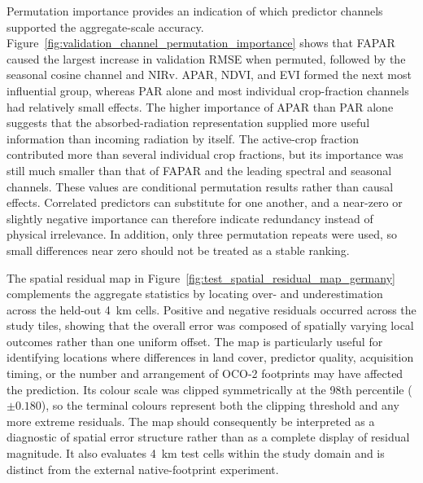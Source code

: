 Permutation importance provides an indication of which predictor channels supported the
aggregate-scale accuracy. Figure~\ref{fig:validation_channel_permutation_importance} shows
that FAPAR caused the largest increase in validation RMSE when permuted, followed by the
seasonal cosine channel and NIRv. APAR, NDVI, and EVI formed the next most influential
group, whereas PAR alone and most individual crop-fraction channels had relatively small
effects. The higher importance of APAR than PAR alone suggests that the absorbed-radiation
representation supplied more useful information than incoming radiation by itself. The
active-crop fraction contributed more than several individual crop fractions, but its
importance was still much smaller than that of FAPAR and the leading spectral and seasonal
channels. These values are conditional permutation results rather than causal effects.
Correlated predictors can substitute for one another, and a near-zero or slightly negative
importance can therefore indicate redundancy instead of physical irrelevance. In addition,
only three permutation repeats were used, so small differences near zero should not be
treated as a stable ranking.

The spatial residual map in Figure~\ref{fig:test_spatial_residual_map_germany} complements
the aggregate statistics by locating over- and underestimation across the held-out 4~km
cells. Positive and negative residuals occurred across the study tiles, showing that the
overall error was composed of spatially varying local outcomes rather than one uniform
offset. The map is particularly useful for identifying locations where differences in land
cover, predictor quality, acquisition timing, or the number and arrangement of OCO-2
footprints may have affected the prediction. Its colour scale was clipped symmetrically at
the 98th percentile ($\pm 0.180$), so the terminal colours represent both the clipping
threshold and any more extreme residuals. The map should consequently be interpreted as a
diagnostic of spatial error structure rather than as a complete display of residual
magnitude. It also evaluates 4~km test cells within the study domain and is distinct from
the external native-footprint experiment.

